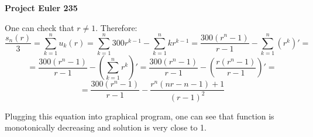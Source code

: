 \documentclass[a4paper,12pt]{article}
\begin{document}
\setlength\parindent{0pt}
\textbf{Project Euler 235}
\vspace{5ex}

One can check that \(r \neq 1\). Therefore:
\[\frac{s_n(r)}{3} = \sum_{k = 1}^n u_k(r) = \sum_{k = 1}^n 300r^{k - 1} - \sum_{k = 1}^n kr^{k - 1} = \frac{300(r^n - 1)}{r - 1} - \sum_{k = 1}^n (r^k)'=\] \[=\frac{300(r^n - 1)}{r - 1} - \left(\sum_{k = 1}^n r^k\right)' = \frac{300(r^n - 1)}{r - 1} - \left(\frac{r(r^n - 1)}{r - 1}\right)' =\] \[= \frac{300(r^n - 1)}{r - 1} - \frac{r^n(nr - n - 1) + 1}{(r - 1)^2}\]

Plugging this equation into graphical program, one can see that function is monotonically decreasing and solution is very close to 1.
\end{document}
